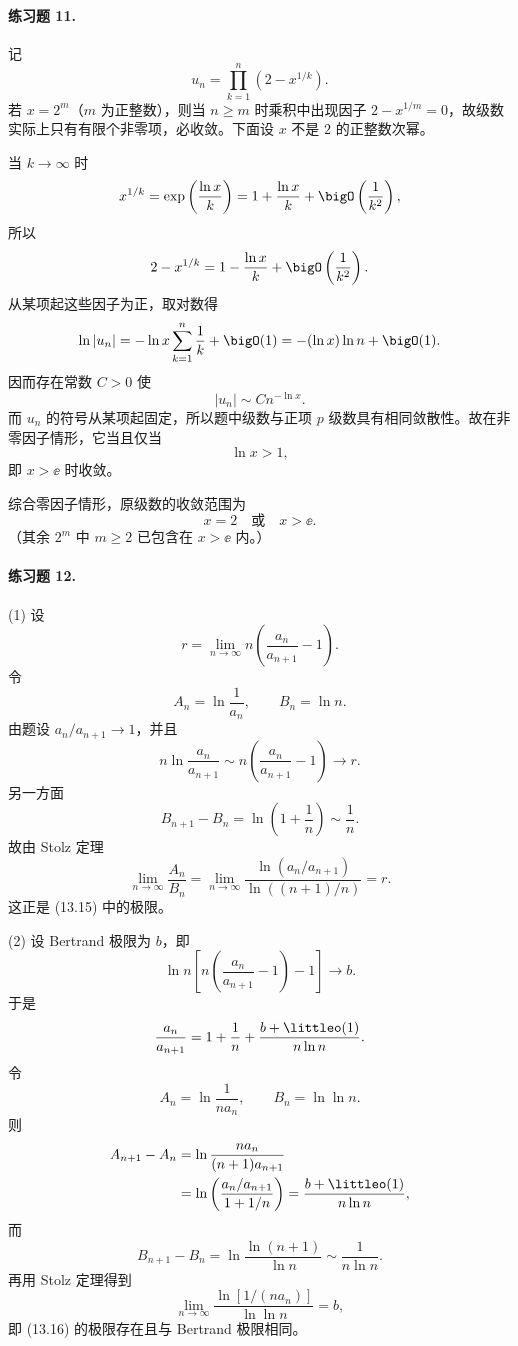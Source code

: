 \paragraph{练习题 11.}
\begin{xsolution}
记
\[
 u_n=\prod_{k=1}^{n}(2-x^{1/k}).
\]
若 $x=2^m$（$m$ 为正整数），则当 $n\geq m$ 时乘积中出现因子 $2-x^{1/m}=0$，故级数实际上只有有限个非零项，必收敛。下面设 $x$ 不是 $2$ 的正整数次幂。

当 $k\to\infty$ 时
\[
 x^{1/k}=\exp\left(\frac{\ln x}{k}\right)
 =1+\frac{\ln x}{k}+\bigO\left(\frac1{k^2}\right),
\]
所以
\[
 2-x^{1/k}
 =1-\frac{\ln x}{k}+\bigO\left(\frac1{k^2}\right).
\]
从某项起这些因子为正，取对数得
\[
 \ln|u_n|
 =-\ln x\sum_{k=1}^{n}\frac1k+\bigO(1)
 =-(\ln x)\ln n+\bigO(1).
\]
因而存在常数 $C>0$ 使
\[
 |u_n|\sim Cn^{-\ln x}.
\]
而 $u_n$ 的符号从某项起固定，所以题中级数与正项 $p$ 级数具有相同敛散性。故在非零因子情形，它当且仅当
\[
 \ln x>1,
\]
即 $x>\ee$ 时收敛。

综合零因子情形，原级数的收敛范围为
\[
 \boxed{x=2\quad\text{或}\quad x>\ee}.
\]
（其余 $2^m$ 中 $m\geq2$ 已包含在 $x>\ee$ 内。）
\end{xsolution}

\paragraph{练习题 12.}
\begin{xsolution}
(1) 设
\[
 r=\lim_{n\to\infty}n\left(\frac{a_n}{a_{n+1}}-1\right).
\]
令
\[
 A_n=\ln\frac1{a_n},\qquad B_n=\ln n.
\]
由题设 $a_n/a_{n+1}\to1$，并且
\[
 n\ln\frac{a_n}{a_{n+1}}
 \sim n\left(\frac{a_n}{a_{n+1}}-1\right)\to r.
\]
另一方面
\[
 B_{n+1}-B_n=\ln\left(1+\frac1n\right)\sim\frac1n.
\]
故由 Stolz 定理
\[
 \lim_{n\to\infty}\frac{A_n}{B_n}
 =\lim_{n\to\infty}
 \frac{\ln(a_n/a_{n+1})}{\ln((n+1)/n)}=r.
\]
这正是 (13.15) 中的极限。

(2) 设 Bertrand 极限为 $b$，即
\[
 \ln n\left[n\left(\frac{a_n}{a_{n+1}}-1\right)-1\right]\to b.
\]
于是
\[
 \frac{a_n}{a_{n+1}}
 =1+\frac1n+\frac{b+\littleo(1)}{n\ln n}.
\]
令
\[
 A_n=\ln\frac1{na_n},\qquad B_n=\ln\ln n.
\]
则
\[
 \begin{aligned}
 A_{n+1}-A_n
 &=\ln\frac{na_n}{(n+1)a_{n+1}}\\
 &=\ln\left(\frac{a_n/a_{n+1}}{1+1/n}\right)
 =\frac{b+\littleo(1)}{n\ln n},
 \end{aligned}
\]
而
\[
 B_{n+1}-B_n
 =\ln\frac{\ln(n+1)}{\ln n}
 \sim\frac1{n\ln n}.
\]
再用 Stolz 定理得到
\[
 \lim_{n\to\infty}\frac{\ln[1/(na_n)]}{\ln\ln n}=b,
\]
即 (13.16) 的极限存在且与 Bertrand 极限相同。
\end{xsolution}

